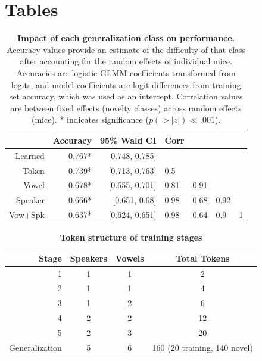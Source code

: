 %


\newpage

\section{Tables}

\begin{table}[ht]
\caption{\label{lmmtab}{\textbf{Impact of each generalization class on performance.} Accuracy values provide an estimate of the difficulty of that class after accounting for the random effects of individual mice. Accuracies are logistic GLMM coefficients transformed from logits, and model coefficients are logit differences from training set accuracy, which was used as an intercept. Correlation values are between fixed effects (novelty classes) across random effects (mice). * indicates significance ($p(>|z|)\ll.001$).}}

\begin{tabular}{@{}rrr|llll@{}}
\begin{tabular}{rrr|llll}
  \hline
 & Accuracy & 95\% Wald CI & Corr &  &  &  \\ 
  \hline
Learned & 0.767* & [0.748, 0.785] &  &  &  &  \\ 
  Token & 0.739* & [0.713, 0.763] & 0.5 &  &  &  \\ 
  Vowel & 0.678* & [0.655, 0.701] & 0.81 & 0.91 &  &  \\ 
  Speaker & 0.666* & [0.651, 0.68] & 0.98 & 0.68 & 0.92 &  \\ 
  Vow+Spk & 0.637* & [0.624, 0.651] & 0.98 & 0.64 & 0.9 & 1 \\ 
   \hline
\end{tabular}

\end{table}
\clearpage


\begin{table}
\label{trainsteps}
\caption{\textbf{Token structure of training stages}}
\begin{ruledtabular}
\begin{tabular}{rccc}
Stage & Speakers & Vowels & Total Tokens\\
\midrule
1 & 1 & 1 & 2\\
2 & 1 & 1 & 4\\
3 & 1 & 2 & 6\\
4 & 2 & 2 & 12\\
5 & 2 & 3 & 20\\
Generalization & 5 & 6 & 160 (20 training, 140 novel)\\
\end{tabular}
\end{ruledtabular}

\end{table}
\clearpage

